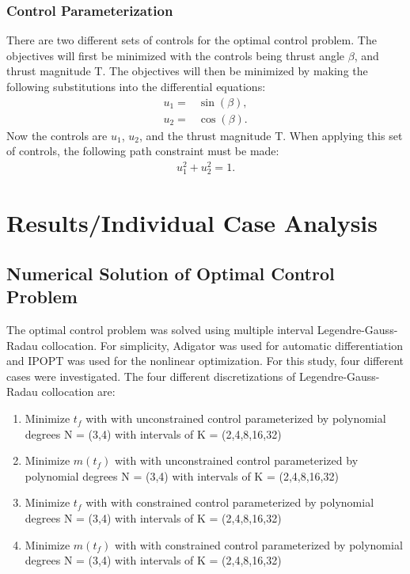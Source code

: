 \documentclass[]{article}
\begin{document}
	\subsubsection{Control Parameterization}
	There are two different sets of controls for the optimal control problem. The objectives will first be minimized with the controls being thrust angle \(\beta\), and thrust magnitude T. The objectives will then be minimized by making the following substitutions into the differential equations:
	\begin{align}                                                                                                                                                                        
    	u_1 =& \sin(\beta), \label{u1_control}\\
    	u_2 =& \cos(\beta). \label{u2_control}
	\end{align}
	Now the controls are \(u_1\), \(u_2\), and the thrust magnitude T. When applying this set of controls, the following path constraint must be made:
	\begin{align}                                                                                                                                                                        
		u_1^2 + u_2^2 = 1. \label{path_constraint}
	\end{align}
	
	\section{Results/Individual Case Analysis}
	\subsection{Numerical Solution of Optimal Control Problem}
	The optimal control problem was solved using multiple interval Legendre-Gauss-Radau collocation. For simplicity, Adigator was used for automatic differentiation and IPOPT was used for the nonlinear optimization. For this study, four different cases were investigated. The four different discretizations of Legendre-Gauss-Radau collocation are:
	\begin{enumerate}
		\item Minimize \(t_f\) with with unconstrained control parameterized by polynomial degrees N = (3,4) with intervals of K = (2,4,8,16,32)
		\item Minimize \(m(t_f)\) with with unconstrained control parameterized by polynomial degrees N = (3,4) with intervals of K = (2,4,8,16,32)
		\item Minimize \(t_f\) with with constrained control parameterized by polynomial degrees N = (3,4) with intervals of K = (2,4,8,16,32)
		\item Minimize \(m(t_f)\) with with constrained control parameterized by polynomial degrees N = (3,4) with intervals of K = (2,4,8,16,32)
	\end{enumerate}
	
\end{document}

